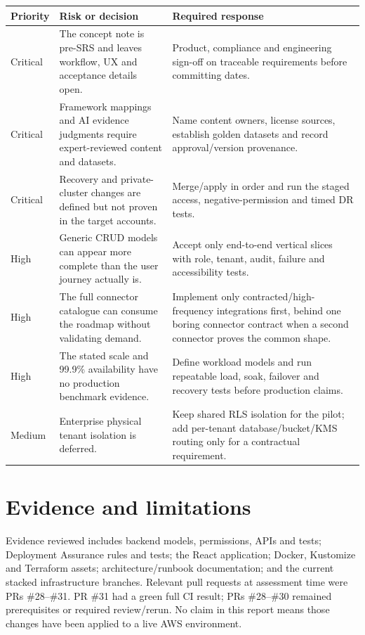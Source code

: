 \documentclass[11pt,a4paper]{article}
\begin{document}
\begin{tabularx}{\textwidth}{p{}X X}
\toprule
Priority & Risk or decision & Required response \\
\midrule
Critical & The concept note is pre-SRS and leaves workflow, UX and acceptance details open. & Product, compliance and engineering sign-off on traceable requirements before committing dates. \\
Critical & Framework mappings and AI evidence judgments require expert-reviewed content and datasets. & Name content owners, license sources, establish golden datasets and record approval/version provenance. \\
Critical & Recovery and private-cluster changes are defined but not proven in the target accounts. & Merge/apply in order and run the staged access, negative-permission and timed DR tests. \\
High & Generic CRUD models can appear more complete than the user journey actually is. & Accept only end-to-end vertical slices with role, tenant, audit, failure and accessibility tests. \\
High & The full connector catalogue can consume the roadmap without validating demand. & Implement only contracted/high-frequency integrations first, behind one boring connector contract when a second connector proves the common shape. \\
High & The stated scale and 99.9\% availability have no production benchmark evidence. & Define workload models and run repeatable load, soak, failover and recovery tests before production claims. \\
Medium & Enterprise physical tenant isolation is deferred. & Keep shared RLS isolation for the pilot; add per-tenant database/bucket/KMS routing only for a contractual requirement. \\
\bottomrule
\end{tabularx}

\section{Evidence and limitations}

Evidence reviewed includes backend models, permissions, APIs and tests; Deployment
Assurance rules and tests; the React application; Docker, Kustomize and Terraform
assets; architecture/runbook documentation; and the current stacked infrastructure
branches. Relevant pull requests at assessment time were PRs \#28--\#31. PR \#31
had a green full CI result; PRs \#28--\#30 remained prerequisites or required
review/rerun. No claim in this report means those changes have been applied to a
live AWS environment.
\end{document}
